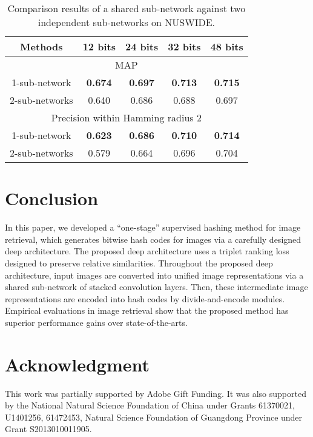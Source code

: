 \documentclass[10pt,twocolumn,letterpaper]{article}
\begin{document}
 \begin{table}[ht!]
\small
    \centering \caption{Comparison results of a shared sub-network against two independent sub-networks on NUSWIDE.}
    \begin{tabular}{|c|c c c c|}
         \hline
Methods & 12 bits & 24 bits & 32 bits & 48 bits  \\
        \hline
        \multicolumn{5}{|c|}{MAP} \\
        \hline
        1-sub-network  & {\bf 0.674 }& {\bf 0.697} & {\bf 0.713} & {\bf 0.715}  \\
        \hline
        2-sub-networks
         & 0.640  & 0.686 & 0.688 & 0.697\\
         \hline
         \multicolumn{5}{|c|}{Precision within Hamming radius 2} \\
        \hline
          1-sub-network& {\bf 0.623 }& {\bf 0.686 } & {\bf 0.710 } & {\bf 0.714 }  \\
        \hline
        2-sub-networks
         &  0.579 & 0.664 & 0.696 & 0.704 \\
         \hline
        \end{tabular}
    \label{sub-network-nus-wide}
\end{table}


\section{Conclusion}
In this paper, we developed a ``one-stage'' supervised hashing method for image retrieval, which generates bitwise hash codes for images via a carefully designed deep architecture. The proposed deep architecture uses a triplet ranking loss designed to preserve
relative similarities. Throughout the proposed deep
architecture, input images are converted into unified image representations via a shared sub-network of stacked
convolution layers. Then, these intermediate image representations are encoded into hash codes by
divide-and-encode modules. Empirical evaluations in image retrieval show that the proposed method has superior performance gains over state-of-the-arts.

\section*{Acknowledgment}
This work was partially supported by Adobe Gift Funding. It was also  supported by the National Natural Science Foundation of China under Grants 61370021, U1401256, 61472453, Natural Science Foundation of Guangdong Province under Grant S2013010011905.
\end{document}

